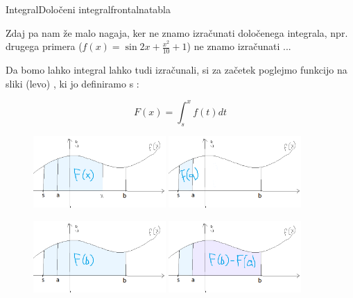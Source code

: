 \begin{priprava}{}{}{Integral}{Določeni integral}{frontalna}{tabla}
\newpage

Zdaj pa nam že malo nagaja, ker ne znamo izračunati določenega integrala, npr. drugega primera ($ f(x) = \sin{2x}+\frac{x^2}{10} + 1 $) ne znamo izračunati ...


Da bomo lahko integral lahko tudi izračunali, si za začetek poglejmo funkcijo na sliki (levo) , ki jo definiramo s :

$$ F(x) = \int_s^x f(t) dt $$

\begin{figure}[h]
    \centering
    \includegraphics[width=0.45\textwidth]{slike/NL_P(x).png}
    \includegraphics[width=0.45\textwidth]{slike/NL_P(a).png}
\end{figure}

\begin{figure}[h]
    \centering
    \includegraphics[width=0.45\textwidth]{slike/NL_P(b).png}
    \includegraphics[width=0.45\textwidth]{slike/NL_P(b)-P(a).png}
\end{figure}


\end{priprava}
